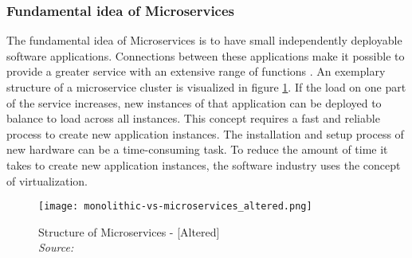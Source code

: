 \documentclass[12pt, a4paper]{article}
\begin{document}
        \subsubsection{Fundamental idea of Microservices}
        The fundamental idea of Microservices is to have small independently deployable software applications. Connections between these applications make it possible to provide a greater service with an extensive range of functions \cite{micro}. An exemplary structure of a microservice cluster is visualized in figure \ref{fig::micro}. If the load on one part of the service increases, new instances of that application can be deployed to balance to load across all instances. This concept requires a fast and reliable process to create new application instances.\newline
        The installation and setup process of new hardware can be a time-consuming task. To reduce the amount of time it takes to create new application instances, the software industry uses the concept of virtualization.

        \begin{figure}
            \centering
            \texttt{[image: monolithic-vs-microservices\_altered.png]}
            \caption{Structure of Microservices - [Altered] \\\textit{Source:~\cite{redhat_micro}}}\label{fig::micro}
        \end{figure}
\end{document}
